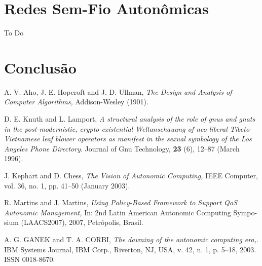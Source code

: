 \documentclass[11pt,twoside]{article}
\begin{document}
\section{Redes Sem-Fio Autonômicas}
To Do
\section{Conclusão}
\begin{thebibliography}{99}

 A. V. Aho, J. E. Hopcroft and J.  D.  Ullman, {\it The
Design and Analysis of Computer Algorithms,} Addison-Wesley (1901).

 D. E. Knuth and L. Lamport, {\it A structural analysis
of the role of gnus and gnats in the post-modernistic, crypto-existential 
Weltanschauung of neo-liberal Tibeto-Vietnamese leaf blower operators 
as manifest in the sexual symbology of the Los Angeles Phone Directory}.
Journal of Gnu Technology, {\bf 23} (6), 12--87
(March 1996).

 J. Kephart and D. Chess, {\it The Vision of Autonomic 
Computing,} IEEE Computer, vol. 36, no. 1, pp. 41--50
(January 2003).

 R. Martins and J. Martins, {\it Using Policy-Based Framework to Support QoS 
Autonomic Management,} In: 2nd Latin American Autonomic Computing Sympo- sium (LAACS2007), 
2007, Petrópolis, Brasil.

 A. G. GANEK and  T. A. CORBI, {\it The dawning of the autonomic computing era,}. IBM Systems Journal, IBM Corp., Riverton, NJ, USA, v. 42, n. 1, p. 5–18, 2003. ISSN 0018-8670.

\end{thebibliography}
\end{document}
